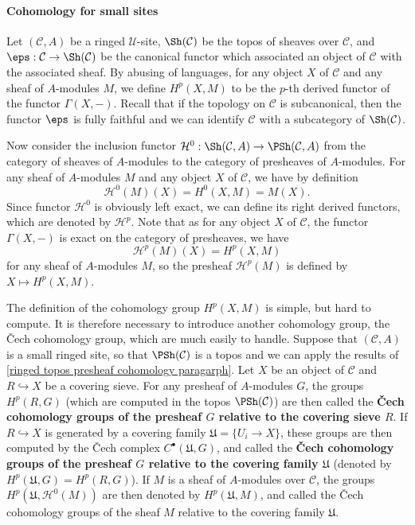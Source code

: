 \paragraph{Cohomology for small sites}\label{ringed small site cohomology paragraph}
Let $(\mathcal{C},A)$ be a ringed $\mathscr{U}$-site, $\Sh(\mathcal{C})$ be the topos of sheaves over $\mathcal{C}$, and $\eps:\mathcal{C}\to \Sh(\mathcal{C})$ be the canonical functor which associated an object of $\mathcal{C}$ with the associated sheaf. By abusing of languages, for any object $X$ of $\mathcal{C}$ and any sheaf of $A$-modules $M$, we define $H^p(X,M)$ to be the $p$-th derived functor of the functor $\Gamma(X,-)$. Recall that if the topology on $\mathcal{C}$ is subcanonical, then the functor $\eps$ is fully faithful and we can identify $\mathcal{C}$ with a subcategory of $\Sh(\mathcal{C})$.\par
Now consider the inclusion functor $\mathcal{H}^0:\Sh(\mathcal{C},A)\to\PSh(\mathcal{C},A)$ from the category of sheaves of $A$-modules to the category of presheaves of $A$-modules. For any sheaf of $A$-modules $M$ and any object $X$ of $\mathcal{C}$, we have by definition
\[\mathcal{H}^0(M)(X)=H^0(X,M)=M(X).\]
Since functor $\mathcal{H}^0$ is obviously left exact, we can define its right derived functors, which are denoted by $\mathcal{H}^p$. Note that as for any object $X$ of $\mathcal{C}$, the functor $\Gamma(X,-)$ is exact on the category of presheaves, we have
\begin{equation}\label{ringed small site sheaf cohomology sheaf section char}
\mathcal{H}^p(M)(X)=H^p(X,M)
\end{equation}
for any sheaf of $A$-modules $M$, so the presheaf $\mathcal{H}^p(M)$ is defined by $X\mapsto H^p(X,M)$.\par
The definition of the cohomology group $H^p(X,M)$ is simple, but hard to compute. It is therefore necessary to introduce another cohomology group, the \v{C}ech cohomology group, which are much easily to handle. Suppose that $(\mathcal{C},A)$ is a small ringed site, so that $\PSh(\mathcal{C})$ is a topos and we can apply the results of \ref{ringed topos presheaf cohomology paragarph}. Let $X$ be an object of $\mathcal{C}$ and $R\hookrightarrow X$ be a covering sieve. For any presheaf of $A$-modules $G$, the groups $H^p(R,G)$ (which are computed in the topos $\PSh(\mathcal{C})$) are then called the \textbf{\v{C}ech cohomology groups of the presheaf $G$ relative to the covering sieve $R$}. If $R\hookrightarrow X$ is generated by a covering family $\mathfrak{U}=\{U_i\to X\}$, these groups are then computed by the \v{C}ech complex $C^\bullet(\mathfrak{U},G)$, and called the \textbf{\v{C}ech cohomology groups of the presheaf $G$ relative to the covering family $\mathfrak{U}$} (denoted by $H^p(\mathfrak{U},G)=H^p(R,G)$). If $M$ is a sheaf of $A$-modules over $\mathcal{C}$, the groups $H^p(\mathfrak{U},\mathcal{H}^0(M))$ are then denoted by $H^p(\mathfrak{U},M)$, and called the \v{C}ech cohomology groups of the sheaf $M$ relative to the covering family $\mathfrak{U}$.\par

